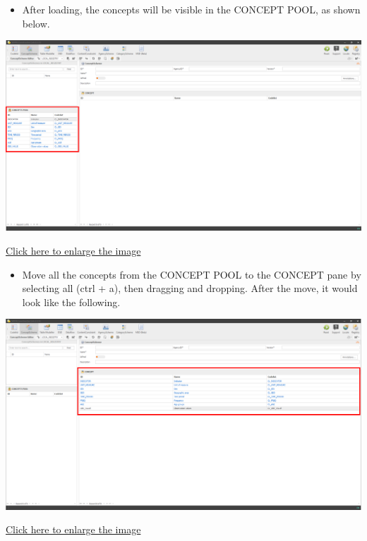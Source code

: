 \documentclass[
]{book}
\providecommand{\tightlist}{%
  \setlength{\itemsep}{0pt}\setlength{\parskip}{0pt}}
\begin{document}
\begin{itemize}
\tightlist
\item
  After loading, the concepts will be visible in the CONCEPT POOL, as shown below.
\end{itemize}

\begin{center}\includegraphics[width=1\linewidth]{./images/image112} \end{center}

\href{images/image112.png}{Click here to enlarge the image}

\begin{itemize}
\tightlist
\item
  Move all the concepts from the CONCEPT POOL to the CONCEPT pane by selecting all (ctrl + a), then dragging and dropping. After the move, it would look like the following.
\end{itemize}

\begin{center}\includegraphics[width=1\linewidth]{./images/image114} \end{center}

\href{images/image114.png}{Click here to enlarge the image}
\end{document}
